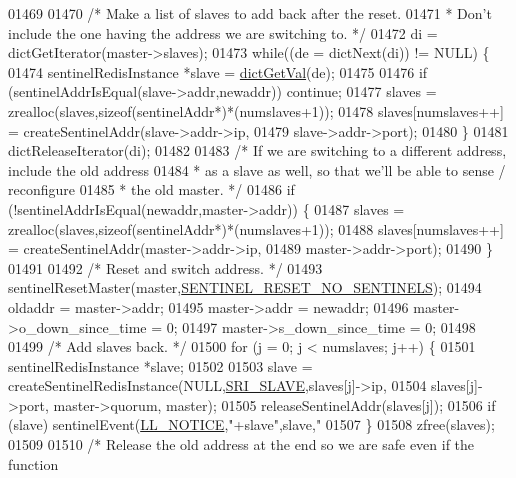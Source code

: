 \begin{DoxyCode}
{{{{{{{{{{{{{{{{{01469 
01470     \textcolor{comment}{/* Make a list of slaves to add back after the reset.}
01471 \textcolor{comment}{     * Don't include the one having the address we are switching to. */}
01472     di = dictGetIterator(master->slaves);
01473     \textcolor{keywordflow}{while}((de = dictNext(di)) != NULL) \{
01474         sentinelRedisInstance *slave = \hyperlink{dict_8h_ae8d2cc391873b2bea2b87c4f80f43120}{dictGetVal}(de);
01475 
01476         \textcolor{keywordflow}{if} (sentinelAddrIsEqual(slave->addr,newaddr)) \textcolor{keywordflow}{continue};
01477         slaves = zrealloc(slaves,\textcolor{keyword}{sizeof}(sentinelAddr*)*(numslaves+1));
01478         slaves[numslaves++] = createSentinelAddr(slave->addr->ip,
01479                                                  slave->addr->port);
01480     \}
01481     dictReleaseIterator(di);
01482 
01483     \textcolor{comment}{/* If we are switching to a different address, include the old address}
01484 \textcolor{comment}{     * as a slave as well, so that we'll be able to sense / reconfigure}
01485 \textcolor{comment}{     * the old master. */}
01486     \textcolor{keywordflow}{if} (!sentinelAddrIsEqual(newaddr,master->addr)) \{
01487         slaves = zrealloc(slaves,\textcolor{keyword}{sizeof}(sentinelAddr*)*(numslaves+1));
01488         slaves[numslaves++] = createSentinelAddr(master->addr->ip,
01489                                                  master->addr->port);
01490     \}
01491 
01492     \textcolor{comment}{/* Reset and switch address. */}
01493     sentinelResetMaster(master,\hyperlink{sentinel_8c_a7cb0584b0d2fb56e4bca40b6776ae9d6}{SENTINEL\_RESET\_NO\_SENTINELS});
01494     oldaddr = master->addr;
01495     master->addr = newaddr;
01496     master->o\_down\_since\_time = 0;
01497     master->s\_down\_since\_time = 0;
01498 
01499     \textcolor{comment}{/* Add slaves back. */}
01500     \textcolor{keywordflow}{for} (j = 0; j < numslaves; j++) \{
01501         sentinelRedisInstance *slave;
01502 
01503         slave = createSentinelRedisInstance(NULL,\hyperlink{sentinel_8c_a4b9db21eda79d49bd9fdf2cf7b3178e8}{SRI\_SLAVE},slaves[j]->ip,
01504                     slaves[j]->port, master->quorum, master);
01505         releaseSentinelAddr(slaves[j]);
01506         \textcolor{keywordflow}{if} (slave) sentinelEvent(\hyperlink{server_8h_a8c54c191e436c7dd3012167212692401}{LL\_NOTICE},\textcolor{stringliteral}{"+slave"},slave,\textcolor{stringliteral}{"%
01507     \}
01508     zfree(slaves);
01509 
01510     \textcolor{comment}{/* Release the old address at the end so we are safe even if the function}
}}}}}}}}}}}}}}}}}}
\end{DoxyCode}
